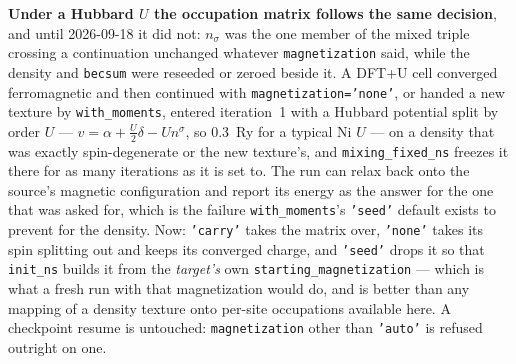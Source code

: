 \documentclass[11pt,a4paper]{article}
\newcommand{\code}[1]{\texttt{\small #1}}
\begin{document}
\textbf{Under a Hubbard $U$ the occupation matrix follows the same decision},
and until 2026-09-18 it did not: $n_\sigma$ was the one member of the mixed
triple crossing a continuation unchanged whatever \code{magnetization} said,
while the density and \code{becsum} were reseeded or zeroed beside it. A DFT+U
cell converged ferromagnetic and then continued with
\code{magnetization='none'}, or handed a new texture by \code{with\_moments},
entered iteration~1 with a Hubbard potential split by order $U$ ---
$v = \alpha + \tfrac{U}{2}\delta - U n^\sigma$, so 0.3~Ry for a typical Ni
$U$ --- on a density that was exactly spin-degenerate or the new texture's, and
\code{mixing\_fixed\_ns} freezes it there for as many iterations as it is set
to. The run can relax back onto the source's magnetic configuration and report
its energy as the answer for the one that was asked for, which is the failure
\code{with\_moments}'s \code{'seed'} default exists to prevent for the
density. Now: \code{'carry'} takes the matrix over, \code{'none'} takes its
spin splitting out and keeps its converged charge, and \code{'seed'} drops it
so that \code{init\_ns} builds it from the \emph{target's} own
\code{starting\_magnetization} --- which is what a fresh run with that
magnetization would do, and is better than any mapping of a density texture
onto per-site occupations available here. A checkpoint resume is untouched:
\code{magnetization} other than \code{'auto'} is refused outright on one.
\end{document}
